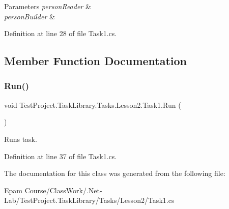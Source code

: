 \begin{DoxyParams}{Parameters}
{\em person\+Reader} & \\
\hline
{\em person\+Builder} & \\
\hline
\end{DoxyParams}


Definition at line 28 of file Task1.\+cs.



\subsection{Member Function Documentation}
\mbox{\label{class_test_project_1_1_task_library_1_1_tasks_1_1_lesson2_1_1_task1_a85d2c7fb175006f04832937a7e08e19a}} 
\subsubsection{\texorpdfstring{Run()}{Run()}}
{\footnotesize\ttfamily void Test\+Project.\+Task\+Library.\+Tasks.\+Lesson2.\+Task1.\+Run (\begin{DoxyParamCaption}{ }\end{DoxyParamCaption})}



Runs task. 



Definition at line 37 of file Task1.\+cs.



The documentation for this class was generated from the following file\+:\begin{DoxyCompactItemize}
\item 
Epam Course/\+Class\+Work/.\+Net-\/\+Lab/\+Test\+Project.\+Task\+Library/\+Tasks/\+Lesson2/Task1.\+cs\end{DoxyCompactItemize}
